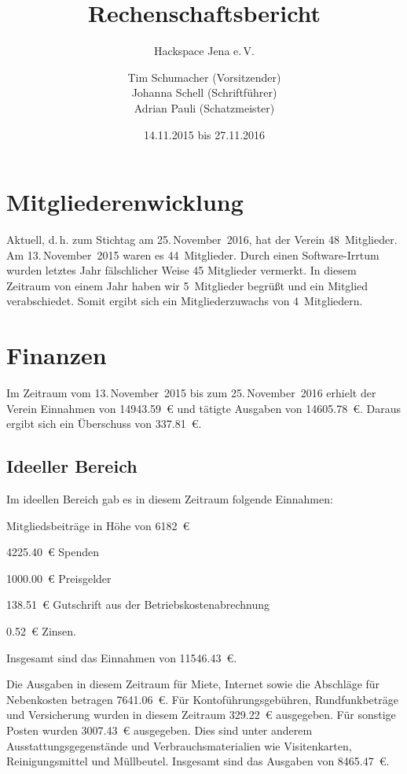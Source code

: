 \documentclass[ngerman]{scrartcl}
\title{Rechenschaftsbericht}
\subtitle{Hackspace Jena e.\,V.}
\author{%
	Tim Schumacher (Vorsitzender)\\
	Johanna Schell (Schriftführer)\\
	Adrian Pauli (Schatzmeister)
}
\date{14.11.2015 bis 27.11.2016}
\begin{document}
\maketitle{}

\tableofcontents{}

\newpage{}

\section{Mitgliederenwicklung}

Aktuell, d.\,h. zum Stichtag am 25.\,November~2016, hat der Verein 48~Mitglieder. Am 13.\,November~2015 waren es 44~Mitglieder. Durch einen Software-Irrtum wurden letztes Jahr fälschlicher Weise 45 Mitglieder vermerkt. In diesem Zeitraum von einem Jahr haben wir 5~Mitglieder begrüßt und ein Mitglied verabschiedet. Somit ergibt sich ein Mitgliederzuwachs von 4~Mitgliedern.

\section{Finanzen}

Im  Zeitraum vom 13.\,November~2015 bis zum 25.\,November~2016 erhielt der Verein Einnahmen von \num{14943,59}~\euro{} und tätigte Ausgaben von \num{14605,78}~\euro{}.
Daraus ergibt sich ein Überschuss von \num{337,81}~\euro{}.

\subsection{Ideeller Bereich}
\label{sec:ideeller_bereich}

Im ideellen Bereich gab es in diesem Zeitraum folgende Einnahmen:
\begin{compactitem}
\item Mitgliedsbeiträge in Höhe von \num{6182}~\euro{}
\item \num{4225,40}~\euro{} Spenden
\item \num{1000,00}~\euro{} Preisgelder
\item \num{138,51}~\euro{} Gutschrift aus der Betriebskostenabrechnung
\item \num{0,52}~\euro{} Zinsen.
\end{compactitem}
Insgesamt sind das Einnahmen von \num{11546,43}~\euro{}.

Die Ausgaben in diesem Zeitraum für Miete, Internet sowie die Abschläge für Nebenkosten betragen \num{7641,06}~\euro{}.
Für Kontoführungsgebühren, Rundfunkbeträge und Versicherung wurden in diesem Zeitraum \num{329,22}~\euro{} ausgegeben.
Für sonstige Posten wurden \num{3007,43}~\euro{} ausgegeben. Dies sind unter anderem Ausstattungsgegenstände und Verbrauchsmaterialien wie Visitenkarten, Reinigungsmittel und Müllbeutel.
Insgesamt sind das Ausgaben von \num{8465,47}~\euro{}.
\end{document}
